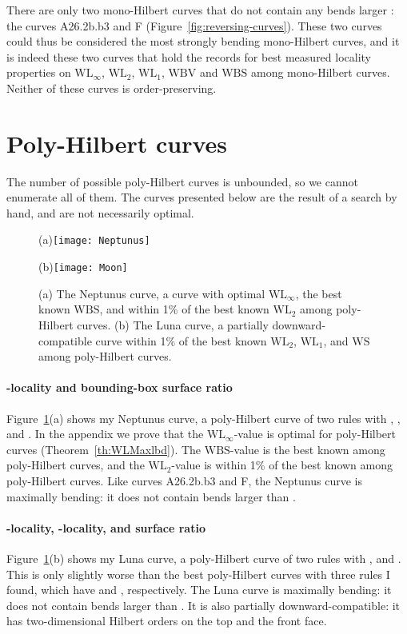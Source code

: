 \documentclass[11pt,a4paper]{article}
\def\WLMax{\ensuremath{\mathrm{WL}_\infty}\xspace}
\def\WLEuc{\ensuremath{\mathrm{WL}_2}\xspace}
\def\WLMan{\ensuremath{\mathrm{WL}_1}\xspace}
\def\WS{\ensuremath{\mathrm{WS}}\xspace}
\def\WBV{\ensuremath{\mathrm{WBV}}\xspace}
\def\WBS{\ensuremath{\mathrm{WBS}}\xspace}
\begin{document}
There are only two mono-Hilbert curves that do not contain any bends larger : the curves A26.2b.b3 and F (Figure~\ref{fig:reversing-curves}). These two curves could thus be considered the most strongly bending mono-Hilbert curves, and it is indeed these two curves that hold the records for best measured locality properties on \WLMax, \WLEuc, \WLMan, \WBV and \WBS among mono-Hilbert curves. Neither of these curves is order-preserving.


\section{Poly-Hilbert curves}

The number of possible poly-Hilbert curves is unbounded, so we cannot enumerate all of them. The curves presented below are the result of a search by hand, and are not necessarily optimal.

\begin{figure}
\centering
(a)\texttt{[image: Neptunus]}

(b)\texttt{[image: Moon]}
\caption{(a) The Neptunus curve, a curve with optimal \WLMax, the best known \WBS, and within 1\% of the best known \WLEuc among poly-Hilbert curves.
(b) The Luna curve, a partially downward-compatible curve within 1\% of the best known \WLEuc, \WLMan, and \WS among poly-Hilbert curves.}
\label{fig:di-curves}
\end{figure}

\paragraph{-locality and bounding-box surface ratio}
Figure~\ref{fig:di-curves}(a) shows my Neptunus curve, a poly-Hilbert curve of two rules with , , and . In the appendix we prove that the \WLMax-value is optimal for poly-Hilbert curves (Theorem~\ref{th:WLMaxlbd}). The \WBS-value is the best known among poly-Hilbert curves, and the \WLEuc-value is within 1\% of the best known among poly-Hilbert curves.
Like curves A26.2b.b3 and F, the Neptunus curve is maximally bending: it does not contain bends larger than .

\paragraph{-locality, -locality, and surface ratio}
Figure~\ref{fig:di-curves}(b) shows my Luna curve, a poly-Hilbert curve of two rules with , and . This is only slightly worse than the best poly-Hilbert curves with three rules I found, which have  and , respectively. The Luna curve is maximally bending: it does not contain bends larger than . It is also partially downward-compatible: it has two-dimensional Hilbert orders on the top and the front face.
\end{document}
